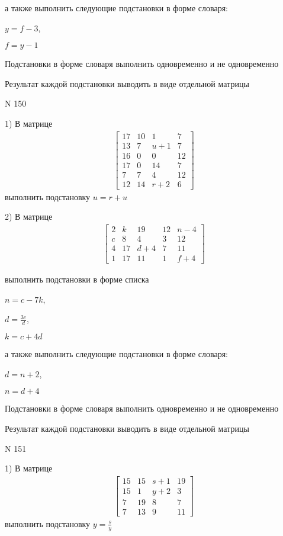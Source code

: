 \documentclass[11pt]{report}
\begin{document}
а также выполнить следующие подстановки в форме словаря:

$y=f - 3$,

$f=y - 1$


    Подстановки в форме словаря выполнить одновременно и не одновременно


    Результат каждой подстановки выводить в виде отдельной матрицы

\newpage
N 150


    1) В матрице
\begin{align*}
\left[\begin{matrix}17 & 10 & 1 & 7\\13 & 7 & u + 1 & 7\\16 & 0 & 0 & 12\\17 & 0 & 14 & 7\\7 & 7 & 4 & 12\\12 & 14 & r + 2 & 6\end{matrix}\right]
\end{align*}
выполнить подстановку $u=r + u$


    2) В матрице
\begin{align*}
\left[\begin{matrix}2 & k & 19 & 12 & n - 4\\c & 8 & 4 & 3 & 12\\4 & 17 & d + 4 & 7 & 11\\1 & 17 & 11 & 1 & f + 4\end{matrix}\right]
\end{align*}

выполнить подстановки в форме списка

$n=c - 7 k$,

$d=\frac{3 c}{d}$,

$k=c + 4 d$

а также выполнить следующие подстановки в форме словаря:

$d=n + 2$,

$n=d + 4$


    Подстановки в форме словаря выполнить одновременно и не одновременно


    Результат каждой подстановки выводить в виде отдельной матрицы

\newpage
N 151


    1) В матрице
\begin{align*}
\left[\begin{matrix}15 & 15 & s + 1 & 19\\15 & 1 & y + 2 & 3\\7 & 19 & 8 & 7\\7 & 13 & 9 & 11\end{matrix}\right]
\end{align*}
выполнить подстановку $y=\frac{s}{y}$
\end{document}
